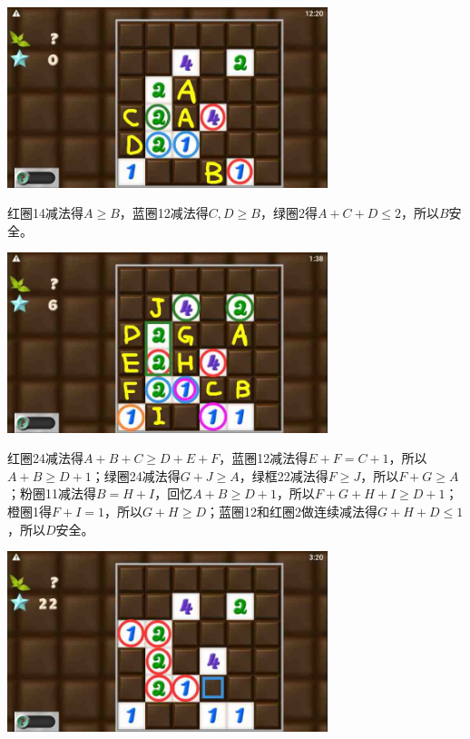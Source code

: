 \subsection{} %
\begin{center}
    \includegraphics[width=0.7\textwidth]{puzzlelow/239-1.jpg}
\end{center}
红圈14减法得$A\ge B$，蓝圈12减法得$C,D\ge B$，绿圈2得$A+C+D\le 2$，所以$B$安全。
\begin{center}
    \includegraphics[width=0.7\textwidth]{puzzlelow/239-2.jpg}
\end{center}
红圈24减法得$A+B+C\ge D+E+F$，蓝圈12减法得$E+F=C+1$，所以$A+B\ge D+1$；绿圈24减法得$G+J\ge A$，绿框22减法得$F\ge J$，所以$F+G\ge A$；粉圈11减法得$B=H+I$，回忆$A+B\ge D+1$，所以$F+G+H+I\ge D+1$；橙圈1得$F+I=1$，所以$G+H\ge D$；蓝圈12和红圈2做连续减法得$G+H+D\le 1$，所以$D$安全。
\begin{center}
    \includegraphics[width=0.7\textwidth]{puzzlelow/239-3.jpg}
\end{center}

